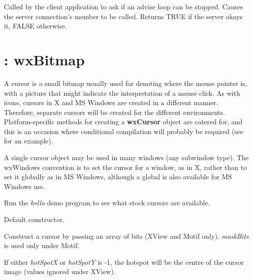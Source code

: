 \label{wxconnectionstopadvise}


Called by the client application to ask if an advise loop can be
stopped. Causes the server connection's  member
to be called. Returns TRUE if the server okays it, FALSE otherwise.

\section{: wxBitmap}\label{wxcursor}

A cursor is a small bitmap usually used for denoting where the mouse
pointer is, with a picture that might indicate the interpretation of a
mouse click. As with icons, cursors in X and MS Windows are created
in a different manner. Therefore, separate cursors will be created for the
different environments.  Platform-specific methods for creating a {\bf
wxCursor} object are catered for, and this is an occasion where
conditional compilation will probably be required (see  for
an example).

A single cursor object may be used in many windows (any subwindow type).
The wxWindows convention is to set the cursor for a window, as in X,
rather than to set it globally as in MS Windows, although a
global  is also available for MS Windows use.

Run the {\it hello} demo program to see what stock cursors are
available.



Default constructor.


Construct a cursor by passing an array of bits (XView and Motif only). {\it maskBits} is used only under Motif.

If either {\it hotSpotX} or {\it hotSpotY} is -1, the hotspot will be the centre of the cursor image (values ignored under XView).


